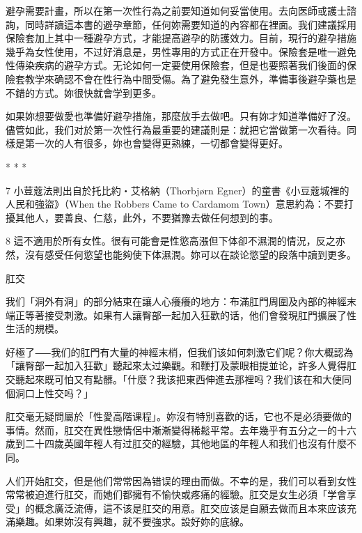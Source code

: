 \documentclass[12pt,UTF8]{ctexbook}
\begin{document}
避孕需要計畫，所以在第一次性行為之前要知道如何妥當使用。去向医師或護士諮詢，同時詳讀這本書的避孕章節，任何妳需要知道的內容都在裡面。我们建議採用保險套加上其中一種避孕方式，才能提高避孕的防護效力。目前，現行的避孕措施幾乎為女性使用，不过好消息是，男性專用的方式正在开發中。保險套是唯一避免性傳染疾病的避孕方式。无论如何一定要使用保險套，但是也要照著我们後面的保險套教学來确認不會在性行為中間受傷。為了避免發生意外，準備事後避孕藥也是不錯的方式。妳很快就會学到更多。

如果妳想要做愛也準備好避孕措施，那麼放手去做吧。只有妳才知道準備好了沒。儘管如此，我们对於第一次性行為最重要的建議則是：就把它當做第一次看待。同樣是第一次的人有很多，妳也會變得更熟練，一切都會變得更好。





* * *



7	小荳蔻法則出自於托比約‧艾格納（Thorbjørn Egner）的童書《小豆蔻城裡的人民和強盜》（When the Robbers Came to Cardamom Town）意思約為：不要打擾其他人，要善良、仁慈，此外，不要猶豫去做任何想到的事。



8	這不適用於所有女性。很有可能會是性慾高漲但下体卻不濕潤的情況，反之亦然，沒有感受任何慾望也能夠使下体濕潤。妳可以在談论慾望的段落中讀到更多。





肛交




我们「洞外有洞」的部分結束在讓人心癢癢的地方：布滿肛門周圍及內部的神經末端正等著接受刺激。如果有人讓臀部一起加入狂歡的话，他们會發現肛門擴展了性生活的規模。

好極了⸺我们的肛門有大量的神經末梢，但我们该如何刺激它们呢？你大概認為「讓臀部一起加入狂歡」聽起來太过樂觀。和鞭打及蒙眼相提並论，許多人覺得肛交聽起來既可怕又有點髒。「什麼？我该把東西伸進去那裡吗？我们该在和大便同個洞口上性交吗？」

肛交毫无疑問屬於「性愛高階课程」。妳沒有特別喜歡的话，它也不是必須要做的事情。然而，肛交在異性戀情侶中漸漸變得稀鬆平常。去年幾乎有五分之一的十六歲到二十四歲英國年輕人有过肛交的經驗，其他地區的年輕人和我们也沒有什麼不同。

人们开始肛交，但是他们常常因為错误的理由而做。不幸的是，我们可以看到女性常常被迫進行肛交，而她们都擁有不愉快或疼痛的經驗。肛交是女生必須「学會享受」的概念廣泛流傳，這不该是肛交的用意。肛交应该是自願去做而且本來应该充滿樂趣。如果妳沒有興趣，就不要強求。設好妳的底線。
\end{document}
